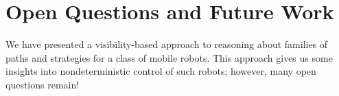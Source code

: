 \documentclass[]{styles/svproc}  %
\begin{document}
%
%
%
%
%
%
%
%



\section{Open Questions and Future Work}

We have presented a visibility-based approach to reasoning about families of
paths and strategies for a class of mobile robots. This approach gives us some
insights into nondeterministic control of such robots; however, many open
questions remain!
\end{document}
